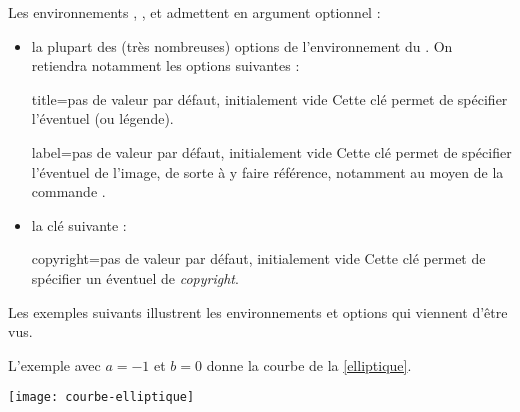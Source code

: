 Les environnements , ,  et
 admettent en argument optionnel :
\begin{itemize}
\item la plupart des (très nombreuses) options de l'environnement
   du . On retiendra notamment
  les options suivantes :
\begin{docKey}{title}{=}{pas de valeur par défaut,
    initialement vide}
  Cette clé permet de spécifier l'éventuel  (ou légende).
\end{docKey}
\begin{docKey}{label}{=}{pas de valeur par défaut, initialement
    vide}
  Cette clé permet de spécifier l'éventuel  de l'image, de sorte
  à y faire référence, notamment au moyen de la commande .
\end{docKey}
\item la clé  suivante :\begin{docKey}{copyright}{=}{pas de valeur par défaut, initialement
    vide}
  Cette clé permet de spécifier un éventuel  de
  \emph{copyright}.
\end{docKey}
\end{itemize}

Les exemples suivants illustrent les environnements et options qui viennent
d'être vus.

\begin{bodycode}[listing options={morekeywords={[2]title,label}}]
L'exemple avec $a=-1$ et $b=0$ donne la courbe de la \vref{elliptique}.
%
\begin{gztfigure}[title=Courbe elliptique correspondant à l'équation
  $y^2=x^3-x$,label=elliptique]
  \texttt{[image: courbe-elliptique]}
\end{gztfigure}
\end{bodycode}

